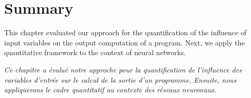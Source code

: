 \section{Summary}

This chapter evaluated our approach for the quantification of the influence of input variables on the output computation of a program. Next, we apply the quantitative framework to the context of neural networks.

\emph{Ce chapitre a évalué notre approche pour la quantification de l'influence des variables d'entrée sur le calcul de la sortie d'un programme. Ensuite, nous appliquerons le cadre quantitatif au contexte des réseaux neuronaux.}
